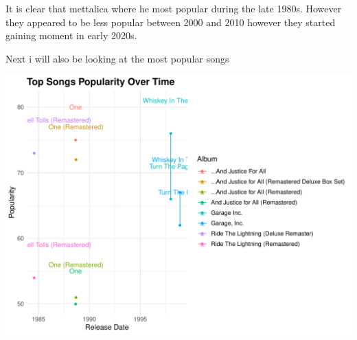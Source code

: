 \documentclass[12pt,preprint, authoryear]{elsarticle}
\let\origfigure\figure
\let\endorigfigure\endfigure
\renewenvironment{figure}[1][2] {
    \expandafter\origfigure\expandafter[H]
} {
    \endorigfigure
}
\numberwithin{equation}{section}
\numberwithin{figure}{section}
\numberwithin{table}{section}
\begin{document}
It is clear that mettalica where he most popular during the late 1980s.
However they appeared to be less popular between 2000 and 2010 however
they started gaining moment in early 2020s.

Next i will also be looking at the most popular songs

\begin{figure}[H]

{\centering \includegraphics{Q3_files/figure-latex/Figure5-1} 

}

\caption{Songs over time  \label{Figure5}}\label{fig:Figure5}
\end{figure}
\end{document}
